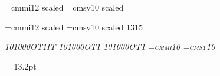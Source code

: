 {{%
\def\secnominalsize{14pt}
\setfont\secrm{}
\setfont\secit{}
\setfont\secsl{}
\setfont\sectt{}
\setfont\secttsl{}
\setfont\secsf{}
\let\secbf\secrm
\setfont\secsc{}
\font\seci=cmmi12 scaled 
\font\secsy=cmsy10 scaled 
\def\sececsize{1440}

\def\ssecnominalsize{13pt}
\setfont\ssecrm{}
\setfont\ssecit{}
\setfont\ssecsl{}
\setfont\ssectt{}
\setfont\ssecttsl{}
\setfont\ssecsf{}
\let\ssecbf\ssecrm
\setfont\ssecsc{}
\font\sseci=cmmi12 scaled \magstephalf
\font\ssecsy=cmsy10 scaled 1315
\def\ssececsize{1200}

\def\reducednominalsize{10pt}
\setfont\reducedrm{}
\setfont\reducedtt{}
\setfont\reducedbf{}
\setfont\reducedit\itshape{10}{1000}{OT1IT}
\setfont\reducedsl\slshape{10}{1000}{OT1}
\setfont\reducedsf{}
\setfont\reducedsc\scshape{10}{1000}{OT1}
\setfont\reducedttsl{}
\font\reducedi=cmmi10
\font\reducedsy=cmsy10
\def\reducedecsize{1000}

\textleading = 13.2pt %
\textfonts            %
\rm
} %


%
\def\definetextfontsizex{%
\def\textnominalsize{10pt}
\edef\mainmagstep{1000}
\setfont\textrm\rmshape{10}{\mainmagstep}{OT1}
\setfont\texttt\ttshape{10}{\mainmagstep}{OT1TT}
\setfont\textbf\bfshape{10}{\mainmagstep}{OT1}
\setfont\textit\itshape{10}{\mainmagstep}{OT1IT}
\setfont\textsl\slshape{10}{\mainmagstep}{OT1}
\setfont\textsf\sfshape{10}{\mainmagstep}{OT1}
\setfont\textsc\scshape{10}{\mainmagstep}{OT1}
\setfont\textttsl\ttslshape{10}{\mainmagstep}{OT1TT}
\font\texti=cmmi10 scaled \mainmagstep
\font\textsy=cmsy10 scaled \mainmagstep
\def\textecsize{1000}

}}
